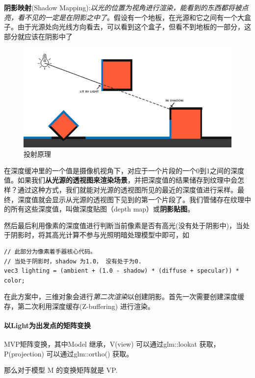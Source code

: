 \documentclass[UTF8,a4paper,12pt]{ctexbook}
\begin{document}
				\textbf{阴影映射}(Shadow Mapping):\textit{以光的位置为视角进行渲染，能看到的东西都将被点亮，看不见的一定是在阴影之中了}。假设有一个地板，在光源和它之间有一个大盒子。由于光源处向光线方向看去，可以看到这个盒子，但看不到地板的一部分，这部分就应该在阴影中了
				
				\begin{figure}[H]
					\centering
					\includegraphics[width=\linewidth]{shadow_mapping_theory}
					\caption{投射原理}
				\end{figure}
			
				在深度缓冲里的一个值是摄像机视角下，对应于一个片段的一个0到1之间的深度值。如果我们\textbf{从光源的透视图来渲染场景}，并把深度值的结果储存到纹理中会怎样？通过这种方式，我们就能对光源的透视图所见的最近的深度值进行采样。最终，深度值就会显示从光源的透视图下见到的第一个片段了。我们管储存在纹理中的所有这些深度值，叫做深度贴图（depth map）或\textbf{阴影贴图}。
				
				然后最后利用像素的深度值进行判断当前像素是否有高光(没有处于阴影中)，当处于阴影时，将其高光计算不参与光照明暗处理模型中即可，如
				\begin{lstlisting}
// 此部分为像素着手器核心代码。				
// 当处于阴影时，shadow 为1.0， 没有处于为0.				
vec3 lighting = (ambient + (1.0 - shadow) * (diffuse + specular)) * color; 				
				\end{lstlisting}
			
				在此方案中，三维对象会进行\textit{第二次渲染}以创建阴影。首先一次需要创建深度缓存，第二次利用深度缓存(Z-buffering) 进行渲染。
				
		
			\paragraph{以Light为出发点的矩阵变换}
				MVP矩阵变换，其中Model 继承，V(view) 可以通过glm::lookat 获取，P(projection) 可以通过glm::ortho() 获取。
					
				那么对于模型 M 的变换矩阵就是 VP. 
		
\end{document}
